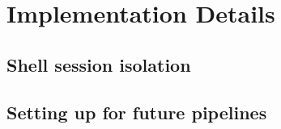 \appendix

\section{Implementation Details}\label{appendix1}

\subsection{Shell session isolation}

\subsection{Setting up for future pipelines}


